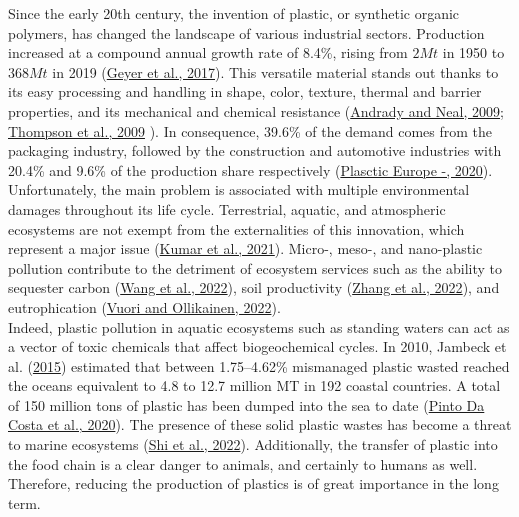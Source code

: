 \documentclass[12pt]{elsarticle} %
\begin{document}
\linenumbers

Since the early 20th century, the invention of plastic, or synthetic organic polymers, has changed the landscape of various industrial sectors.
Production increased at a compound annual growth rate of 8.4\%, rising from \(2Mt\) in 1950 to \(368Mt\) in 2019 (\protect\hyperlink{ref-Geyer2017}{Geyer et al., 2017}).
This versatile material stands out thanks to its easy processing and handling in shape, color, texture, thermal and barrier properties, and its mechanical and chemical resistance (\protect\hyperlink{ref-Andrady2009}{Andrady and Neal, 2009}; \protect\hyperlink{ref-Thompson2009a}{Thompson et al., 2009} ).
In consequence, 39.6\% of the demand comes from the packaging industry, followed by the construction and automotive industries with 20.4\% and 9.6\% of the production share respectively (\protect\hyperlink{ref-PlascticEurope2020}{Plasctic Europe -, 2020}).
Unfortunately, the main problem is associated with multiple environmental damages throughout its life cycle.
Terrestrial, aquatic, and atmospheric ecosystems are not exempt from the externalities of this innovation, which represent a major issue (\protect\hyperlink{ref-Kumar2021}{Kumar et al., 2021}).
Micro-, meso-, and nano-plastic pollution contribute to the detriment of ecosystem services such as the ability to sequester carbon (\protect\hyperlink{ref-wang2022a}{Wang et al., 2022}), soil productivity (\protect\hyperlink{ref-zhang2022b}{Zhang et al., 2022}), and eutrophication (\protect\hyperlink{ref-vuori2022}{Vuori and Ollikainen, 2022}).\\
Indeed, plastic pollution in aquatic ecosystems such as standing waters can act as a vector of toxic chemicals that affect biogeochemical cycles.
In 2010, Jambeck et al. (\protect\hyperlink{ref-jambeck2015}{2015}) estimated that between 1.75--4.62\% mismanaged plastic wasted reached the oceans equivalent to 4.8 to 12.7 million MT in 192 coastal countries.
A total of 150 million tons of plastic has been dumped into the sea to date (\protect\hyperlink{ref-pintodacosta2020}{Pinto Da Costa et al., 2020}).
The presence of these solid plastic wastes has become a threat to marine ecosystems (\protect\hyperlink{ref-shi2022}{Shi et al., 2022}).
Additionally, the transfer of plastic into the food chain is a clear danger to animals, and certainly to humans as well.
Therefore, reducing the production of plastics is of great importance in the long term.
\end{document}
